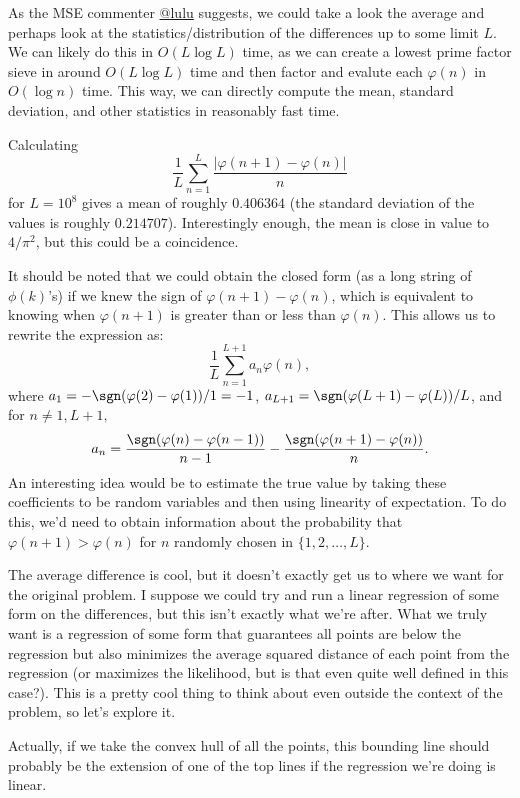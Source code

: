 \documentclass[a4paper, 12pt]{article}
\begin{document}
\begin{idea}
    As the MSE commenter \href{https://math.stackexchange.com/users/252071/lulu}{@lulu} suggests, we could take a look the average and perhaps look at the statistics/distribution of the differences up to some limit \( L \). We can likely do this in \( O(L \log L) \) time, as we can create a lowest prime factor sieve in around \( O(L \log L) \) time and then factor and evalute each \( \varphi(n) \) in \( O(\log n) \) time. This way, we can directly compute the mean, standard deviation, and other statistics in reasonably fast time.

    Calculating
    \[
        \frac{1}{L} \sum_{n = 1}^{L} \frac{|\varphi(n + 1) - \varphi(n)|}{n}
    \]
    for \( L = 10^8 \) gives a mean of roughly \( 0.406364 \) (the standard deviation of the values is roughly \( 0.214707 \)). Interestingly enough, the mean is close in value to \( 4 / \pi^2 \), but this could be a coincidence.

    It should be noted that we could obtain the closed form (as a long string of \( \phi(k) \)'s) if we knew the sign of \( \varphi(n + 1) - \varphi(n) \), which is equivalent to knowing when \( \varphi(n + 1) \) is greater than or less than \( \varphi(n) \). This allows us to rewrite the expression as:
    \[
        \frac{1}{L} \sum_{n = 1}^{L+1} a_n \varphi(n)
    ,\]
    where \( a_1 = -\sgn(\varphi(2) - \varphi(1)) / 1 = -1 \), \( a_{L + 1} = \sgn(\varphi(L + 1) - \varphi(L)) / L \), and for \( n \ne 1, L + 1, \)
    \[
        a_n = \frac{\sgn(\varphi(n) - \varphi(n - 1))}{n-1} - \frac{\sgn(\varphi(n + 1) - \varphi(n))}{n}
    .\]
    An interesting idea would be to estimate the true value by taking these coefficients to be random variables and then using linearity of expectation. To do this, we'd need to obtain information about the probability that \( \varphi(n + 1) > \varphi(n) \) for \( n \) randomly chosen in \( \{ 1, 2, \ldots, L \} \).
\end{idea}

\begin{idea}
    The average difference is cool, but it doesn't exactly get us to where we want for the original problem. I suppose we could try and run a linear regression of some form on the differences, but this isn't exactly what we're after. What we truly want is a regression of some form that guarantees all points are below the regression but also minimizes the average squared distance of each point from the regression (or maximizes the likelihood, but is that even quite well defined in this case?). This is a pretty cool thing to think about even outside the context of the problem, so let's explore it.

    Actually, if we take the convex hull of all the points, this bounding line should probably be the extension of one of the top lines if the regression we're doing is linear.

\end{idea}
\end{document}
